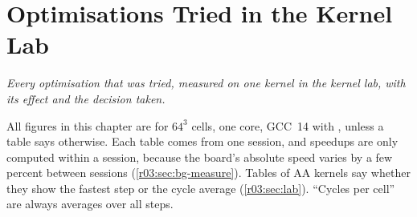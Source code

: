 \chapter{Optimisations Tried in the Kernel Lab}\label{r03:ch:levers}

\emph{Every optimisation that was tried, measured on one kernel in the kernel lab, with its
effect and the decision taken.}

All figures in this chapter are for $64^3$ cells, one core, GCC~14 with , unless a
table says otherwise. Each table comes from one session, and speedups are only computed within
a session, because the board's absolute speed varies by a few percent between sessions
(\cref{r03:sec:bg-measure}). Tables of AA kernels say whether they show the fastest step or the
cycle average (\cref{r03:sec:lab}). ``Cycles per cell'' are always averages over all steps.

